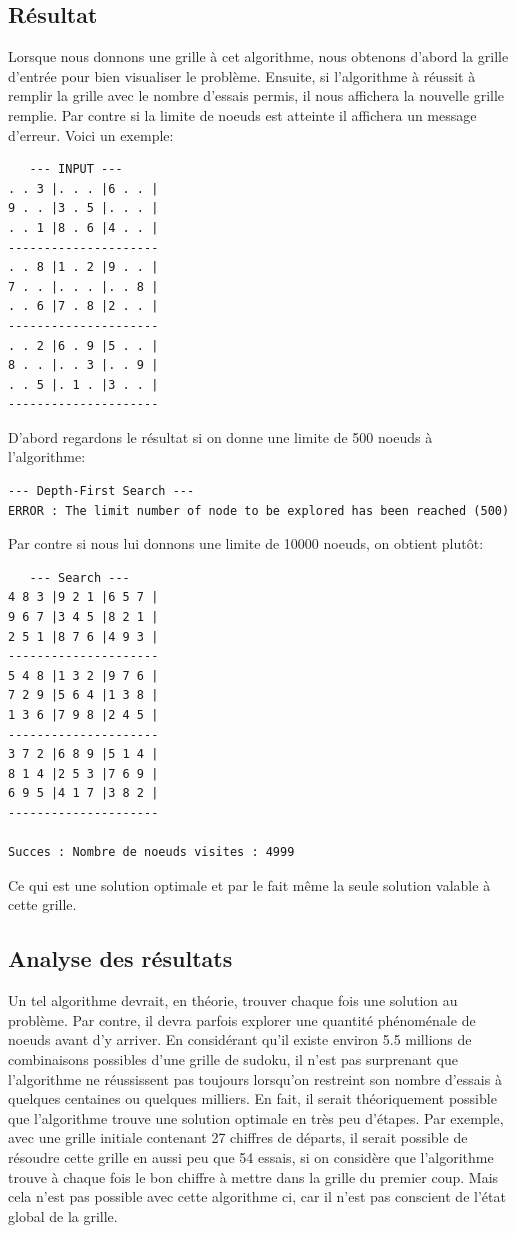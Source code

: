 \documentclass[a4paper,10pt]{article}
\begin{document}
\subsection{Résultat}
\label{sec:res}
Lorsque nous donnons une grille à cet algorithme, nous obtenons  d'abord la grille d'entrée pour bien visualiser le problème. Ensuite, si l'algorithme à réussit à remplir la grille avec le nombre d'essais permis, il nous affichera la nouvelle grille remplie. Par contre si la limite de noeuds est atteinte il affichera un message d'erreur. Voici un exemple:

\begin{verbatim}
   --- INPUT ---
. . 3 |. . . |6 . . |
9 . . |3 . 5 |. . . |
. . 1 |8 . 6 |4 . . |
---------------------
. . 8 |1 . 2 |9 . . |
7 . . |. . . |. . 8 |
. . 6 |7 . 8 |2 . . |
---------------------
. . 2 |6 . 9 |5 . . |
8 . . |. . 3 |. . 9 |
. . 5 |. 1 . |3 . . |
---------------------
\end{verbatim}

D'abord regardons le résultat si on donne une limite de 500 noeuds à l'algorithme:

\begin{verbatim}
--- Depth-First Search ---
ERROR : The limit number of node to be explored has been reached (500)
\end{verbatim}

Par contre si nous lui donnons une limite de 10000 noeuds, on obtient plutôt:

\begin{verbatim}
   --- Search ---
4 8 3 |9 2 1 |6 5 7 |
9 6 7 |3 4 5 |8 2 1 |
2 5 1 |8 7 6 |4 9 3 |
---------------------
5 4 8 |1 3 2 |9 7 6 |
7 2 9 |5 6 4 |1 3 8 |
1 3 6 |7 9 8 |2 4 5 |
---------------------
3 7 2 |6 8 9 |5 1 4 |
8 1 4 |2 5 3 |7 6 9 |
6 9 5 |4 1 7 |3 8 2 |
---------------------

Succes : Nombre de noeuds visites : 4999
\end{verbatim}

Ce qui est une solution optimale et par le fait même la seule solution valable à cette grille.


\subsection{Analyse des résultats}
Un tel algorithme devrait, en théorie, trouver chaque fois une solution au problème. Par contre, il devra parfois explorer une quantité phénoménale de noeuds avant d'y arriver. En considérant qu'il existe environ 5.5 millions de combinaisons possibles d'une grille de sudoku, il n'est pas surprenant que l'algorithme ne réussissent pas toujours lorsqu'on restreint son nombre d'essais à quelques centaines ou quelques milliers. En fait, il serait théoriquement possible que l'algorithme trouve une solution optimale en très peu d'étapes. Par exemple, avec une grille initiale contenant 27 chiffres de départs, il serait possible de résoudre cette grille en aussi peu que 54 essais, si on considère que l'algorithme trouve à chaque fois le bon chiffre à mettre dans la grille du premier coup. Mais cela n'est pas possible avec cette algorithme ci, car il n'est pas conscient de l'état global de la grille.  \\
\end{document}
